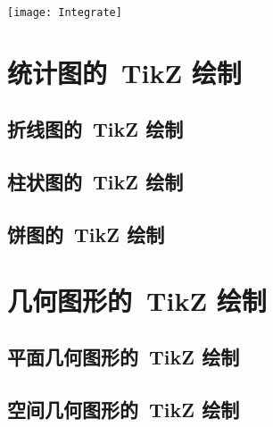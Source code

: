 \documentclass[
  paper=a4,
  pagesize=pdftex,
  twoside=false,
  toc=listof,
  BCOR=0pt,
  DIV=15,
  indent,
]{scrartcl}
\begin{document}
\begin{minipage}[c]{0.485\linewidth}
   
\end{minipage}
\begin{minipage}[c]{0.485\linewidth}
  \centering
 \texttt{[image: Integrate]}
\end{minipage}

\section{统计图的~TikZ 绘制}

\subsection{折线图的~TikZ 绘制}

\subsection{柱状图的~TikZ 绘制}

\subsection{饼图的~TikZ 绘制}

\section{几何图形的~TikZ 绘制}

\subsection{平面几何图形的~TikZ 绘制}

\subsection{空间几何图形的~TikZ 绘制}
\end{document}
